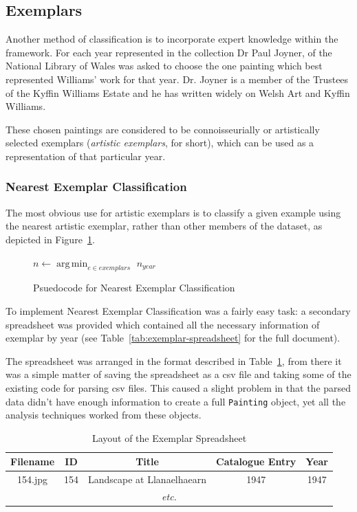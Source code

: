 \subsection{Exemplars}
Another method of classification is to incorporate expert knowledge within the framework. For each
year represented in the collection Dr Paul Joyner, of the National Library of Wales was asked to
choose the one painting which best represented Williams' work for that year. Dr. Joyner is a 
member of the Trustees of the Kyffin Williams Estate and he has written widely on Welsh Art and
Kyffin Williams.

These chosen paintings are considered to be connoisseurially or artistically selected exemplars
(\emph{artistic exemplars}, for short), which can be used as a representation of that particular
year.


\subsubsection{Nearest Exemplar Classification}
The most obvious use for artistic exemplars is to classify a given example using the nearest 
artistic exemplar, rather than other members of the dataset, as depicted in 
Figure~\ref{fig:nearest-exemplar}.

\begin{figure}[h]
\begin{algorithmic}
\State $n \gets \operatorname*{arg\,min}_{e \in exemplars}$ 
\State \Return $n_{year}$
\EndFunction
\end{algorithmic}
\caption{Psuedocode for Nearest Exemplar Classification}\label{fig:nearest-exemplar}
\end{figure}

To implement Nearest Exemplar Classification was a fairly easy task: a secondary spreadsheet was 
provided which contained all the necessary information of exemplar by year (see 
Table~\ref{tab:exemplar-spreadsheet} for the full document).

The spreadsheet was arranged in the format described in Table~\ref{tab:exemplar-layout}, from
there it was a simple matter of saving the spreadsheet as a \gls{csv} file and taking some of the
existing code for parsing \gls{csv} files. This caused a slight problem in that the parsed data
didn't have enough information to create a full \texttt{Painting} object, yet all the analysis
techniques worked from these objects.

\begin{table}[h]
\centering
\begin{tabular}{|c|c|c|c|c|} \hline
Filename & ID  & Title                      & Catalogue Entry & Year \\\hline
154.jpg  & 154 & Landscape at Llanaelhaearn & 1947            & 1947 \\\hline
\multicolumn{5}{|c|}{\textit{etc.}}\\\hline
\end{tabular}
\caption{Layout of the Exemplar Spreadsheet}\label{tab:exemplar-layout}
\end{table}

